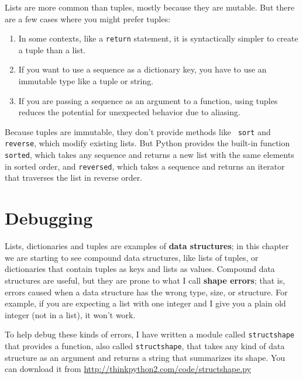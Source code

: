 Lists are more common than tuples, mostly because they are mutable.
But there are a few cases where you might prefer tuples:

\begin{enumerate}

\item In some contexts, like a {\tt return} statement, it is
syntactically simpler to create a tuple than a list.

\item If you want to use a sequence as a dictionary key, you
have to use an immutable type like a tuple or string.

\item If you are passing a sequence as an argument to a function,
using tuples reduces the potential for unexpected behavior
due to aliasing.

\end{enumerate}

Because tuples are immutable, they don't provide methods like {\tt
  sort} and {\tt reverse}, which modify existing lists.  But Python
provides the built-in function {\tt sorted}, which takes any sequence
and returns a new list with the same elements in sorted order, and
{\tt reversed}, which takes a sequence and returns an iterator that
traverses the list in reverse order.
 


\section{Debugging}

Lists, dictionaries and tuples are examples of {\bf data
  structures}; in this chapter we are starting to see compound data
structures, like lists of tuples, or dictionaries that contain tuples
as keys and lists as values.  Compound data structures are useful, but
they are prone to what I call {\bf shape errors}; that is, errors
caused when a data structure has the wrong type, size, or structure.
For example, if you are expecting a list with one integer and I
give you a plain old integer (not in a list), it won't work.

To help debug these kinds of errors, I have written a module
called {\tt structshape} that provides a function, also called
{\tt structshape}, that takes any kind of data structure as
an argument and returns a string that summarizes its shape.
You can download it from \url{http://thinkpython2.com/code/structshape.py}

